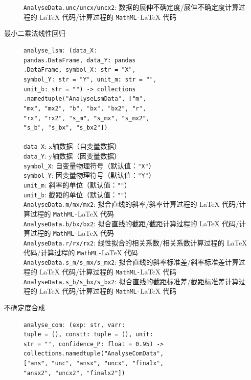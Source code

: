 \begin{description}
  \verb|AnalyseData.unc/uncx/uncx2|: 数据的展伸不确定度/展伸不确定度计算过程的 \LaTeX{} 代码/计算过程的 \verb|MathML-|\LaTeX{} 代码
  \item[最小二乘法线性回归] \verb|analyse_lsm: (data_X:|\\\verb|pandas.DataFrame, data_Y: pandas|\\\verb|.DataFrame, symbol_X: str = "X",|\\\verb|symbol_Y: str = "Y", unit_m: str = "",|\\\verb|unit_b: str = "") -> collections|\\\verb|.namedtuple("AnalyseLsmData", ["m",|\\\verb|"mx", "mx2", "b", "bx", "bx2", "r",|\\\verb|"rx", "rx2", "s_m", "s_mx", "s_mx2",|\\\verb|"s_b", "s_bx", "s_bx2"])|\\
  \\
  \verb|data_X|: x轴数据（自变量数据）\\
  \verb|data_Y|: y轴数据（因变量数据）\\
  \verb|symbol_X|: 自变量物理符号（默认值：\verb|"X"|）\\
  \verb|symbol_Y|: 因变量物理符号（默认值：\verb|"Y"|）\\
  \verb|unit_m|: 斜率的单位（默认值：\verb|""|）\\
  \verb|unit_b|: 截距的单位（默认值：\verb|""|）\\
  \verb|AnalyseData.m/mx/mx2|: 拟合直线的斜率/斜率计算过程的 \LaTeX{} 代码/计算过程的 \verb|MathML-|\LaTeX{} 代码\\
  \verb|AnalyseData.b/bx/bx2|: 拟合直线的截距/截距计算过程的 \LaTeX{} 代码/计算过程的 \verb|MathML-|\LaTeX{} 代码\\
  \verb|AnalyseData.r/rx/rx2|: 线性拟合的相关系数/相关系数计算过程的 \LaTeX{} 代码/计算过程的 \verb|MathML-|\LaTeX{} 代码\\
  \verb|AnalyseData.s_m/s_mx/s_mx2|: 拟合直线的斜率标准差/斜率标准差计算过程的 \LaTeX{} 代码/计算过程的 \verb|MathML-|\LaTeX{} 代码\\
  \verb|AnalyseData.s_b/s_bx/s_bx2|: 拟合直线的截距标准差/截距标准差计算过程的 \LaTeX{} 代码/计算过程的 \verb|MathML-|\LaTeX{} 代码
  \item[不确定度合成] \verb|analyse_com: (exp: str, varr:|\\\verb|tuple = (), constt: tuple = (), unit:|\\\verb|str = "", confidence_P: float = 0.95) ->|\\\verb|collections.namedtuple("AnalyseComData",|\\\verb|["ans", "unc", "ansx", "uncx", "finalx",|\\\verb|"ansx2", "uncx2", "finalx2"])|\\

\end{description}
